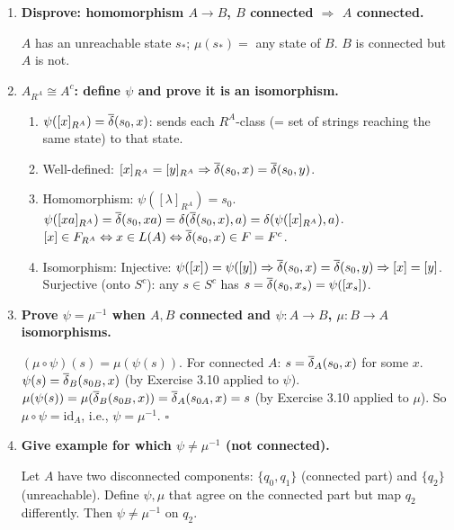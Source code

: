 \begin{enumerate}[{3.}1.]
\item \textbf{Disprove: homomorphism $A\to B$, $B$ connected $\Rightarrow$ $A$ connected.}

$A$ has an unreachable state $s_*$; $\mu(s_*)=$ any state of $B$. $B$ is connected but $A$ is not.

\item \textbf{$A_{R^A}\cong A^c$: define $\psi$ and prove it is an isomorphism.}

\begin{enumerate}
\item $\psi([x]_{R^A})=\overline{\delta}(s_0,x)$: sends each $R^A$-class (= set of strings reaching the same state) to that state.

\item Well-defined: $[x]_{R^A}=[y]_{R^A}\Rightarrow\overline{\delta}(s_0,x)=\overline{\delta}(s_0,y)$. \checkmark

\item Homomorphism: $\psi([\lambda]_{R^A})=s_0$. $\psi([xa]_{R^A})=\overline{\delta}(s_0,xa)=\delta(\overline{\delta}(s_0,x),a)=\delta(\psi([x]_{R^A}),a)$. $[x]\in F_{R^A}\Leftrightarrow x\in L(A)\Leftrightarrow\overline{\delta}(s_0,x)\in F=F^c$. \checkmark

\item Isomorphism: Injective: $\psi([x])=\psi([y])\Rightarrow\overline{\delta}(s_0,x)=\overline{\delta}(s_0,y)\Rightarrow[x]=[y]$. Surjective (onto $S^c$): any $s\in S^c$ has $s=\overline{\delta}(s_0,x_s)=\psi([x_s])$.
\end{enumerate}

\item \textbf{Prove $\psi=\mu^{-1}$ when $A,B$ connected and $\psi: A\to B$, $\mu: B\to A$ isomorphisms.}

$(\mu\circ\psi)(s)=\mu(\psi(s))$. For connected $A$: $s=\overline{\delta}_A(s_0,x)$ for some $x$. $\psi(s)=\overline{\delta}_B(s_{0B},x)$ (by Exercise 3.10 applied to $\psi$). $\mu(\psi(s))=\mu(\overline{\delta}_B(s_{0B},x))=\overline{\delta}_A(s_{0A},x)=s$ (by Exercise 3.10 applied to $\mu$). So $\mu\circ\psi=\mathrm{id}_A$, i.e., $\psi=\mu^{-1}$. $\square$

\item \textbf{Give example for which $\psi\neq\mu^{-1}$ (not connected).}

Let $A$ have two disconnected components: $\{q_0,q_1\}$ (connected part) and $\{q_2\}$ (unreachable). Define $\psi,\mu$ that agree on the connected part but map $q_2$ differently. Then $\psi\neq\mu^{-1}$ on $q_2$.


\end{enumerate}
